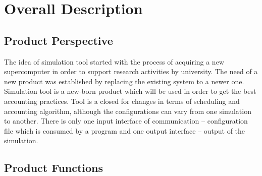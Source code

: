 
\chapter{Overall Description} \label{chp:overall-description}

\section{Product Perspective}
	\begin{comment}
		$<$Describe the context and origin of the product being specified in this SRS.  
		For example, state whether this product is a follow-on member of a product 
		family, a replacement for certain existing systems, or a new, self-contained 
		product. If the SRS defines a component of a larger system, relate the 
		requirements of the larger system to the functionality of this software and 
		identify interfaces between the two. A simple diagram that shows the major 
		components of the overall system, subsystem interconnections, and external 
		interfaces can be helpful.$>$
	\end{comment}

	The idea of simulation tool started with the process of acquiring a new supercomputer in order to support research activities by university. The need of a new product was established by replacing the existing system to a newer one. Simulation tool is a new-born product which will be used in order to get the best accounting practices. Tool is a closed for changes in terms of scheduling and accounting algorithm, although the configurations can vary from one simulation to another. There is only one input interface of communication -- configuration file which is consumed by a program and one output interface -- output of the simulation.
\section{Product Functions}
	\begin{comment}
		$<$Summarize the major functions the product must perform or must let the user 
		perform. Details will be provided in Section 3, so only a high level summary 
		(such as a bullet list) is needed here. Organize the functions to make them 
		understandable to any reader of the SRS. A picture of the major groups of 
		related requirements and how they relate, such as a top level data flow diagram 
		or object class diagram, is often effective.$>$
	\end{comment}

